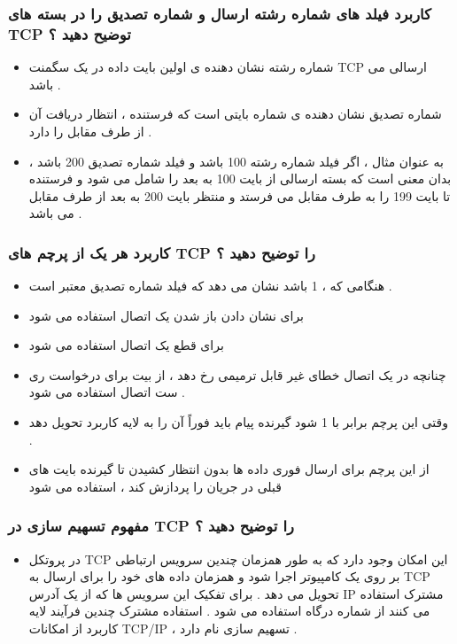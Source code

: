 \documentclass[12pt]{book}
\begin{document}
\subsubsection{
 کاربرد فیلد های شماره رشته ارسال و شماره تصدیق را در بسته های TCP توضیح دهید ؟
}


\begin{itemize}
	\item شماره رشته نشان دهنده ی اولین بایت داده در یک سگمنت TCP ارسالی می باشد .
	\item شماره تصدیق نشان دهنده ی  شماره بایتی است که فرستنده ، انتظار دریافت آن از طرف مقابل را دارد .
	\item به عنوان مثال ، اگر فیلد شماره رشته 100 باشد و فیلد شماره تصدیق 200 باشد ، بدان معنی است که بسته ارسالی از بایت 100 به بعد را شامل می شود و فرستنده تا بایت 199 را به طرف مقابل می فرستد و منتظر بایت 200 به بعد از طرف مقابل می باشد .
\end{itemize}




\subsubsection{
 کاربرد هر یک از پرچم های TCP را توضیح دهید ؟
}


\begin{itemize}
	\item [\lr{ACK}] هنگامی که
، 	1 باشد نشان می دهد که فیلد شماره تصدیق معتبر است .
	\item [\lr{SYN}] برای نشان دادن باز شدن یک اتصال استفاده می شود
	\item [\lr{FIN}] برای قطع یک اتصال استفاده می شود
	\item [\lr{RST}] چنانچه در یک اتصال
	خطای غیر قابل ترمیمی رخ دهد ، از بیت
	برای درخواست ری ست اتصال استفاده می شود .
	\item [\lr{PSH}] وقتی این پرچم برابر با 1 شود
	گیرنده پیام باید فوراً آن را به لایه کاربرد تحویل دهد .
	\item [\lr{URG}] از این پرچم برای ارسال فوری داده ها بدون انتظار کشیدن تا گیرنده بایت های قبلی در جریان را پردازش کند ، استفاده می شود 
\end{itemize}




\subsubsection{
 مفهوم تسهیم سازی در TCP را توضیح دهید ؟
}


\begin{itemize}
	\item در پروتکل TCP 
	این امکان وجود دارد که به طور همزمان چندین سرویس ارتباطی بر روی یک کامپیوتر اجرا شود و همزمان داده های خود را برای ارسال به TCP تحویل می دهد .
	برای تفکیک این سرویس ها که از یک آدرس IP مشترک استفاده می کنند از شماره درگاه استفاده می شود .
	استفاده مشترک چندین فرآیند لایه کاربرد از امکانات TCP/IP ، تسهیم سازی نام دارد .
\end{itemize}
\end{document}
